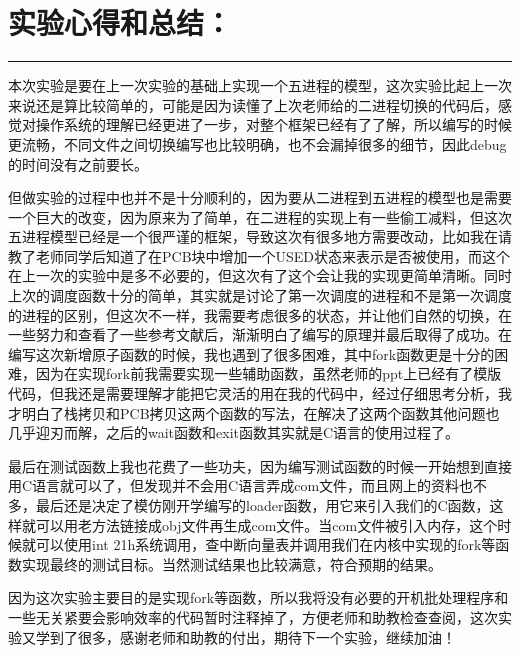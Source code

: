 \documentclass[UTF8]{article}
\begin{document}
\section{实验心得和总结：}
\noindent\rule[0.2\baselineskip]{\textwidth}{0.5pt}
\heiti
\par 本次实验是要在上一次实验的基础上实现一个五进程的模型，这次实验比起上一次来说还是算比较简单的，可能是因为读懂了上次老师给的二进程切换的代码后，感觉对操作系统的理解已经更进了一步，对整个框架已经有了了解，所以编写的时候更流畅，不同文件之间切换编写也比较明确，也不会漏掉很多的细节，因此debug的时间没有之前要长。
\par 但做实验的过程中也并不是十分顺利的，因为要从二进程到五进程的模型也是需要一个巨大的改变，因为原来为了简单，在二进程的实现上有一些偷工减料，但这次五进程模型已经是一个很严谨的框架，导致这次有很多地方需要改动，比如我在请教了老师同学后知道了在PCB块中增加一个USED状态来表示是否被使用，而这个在上一次的实验中是多不必要的，但这次有了这个会让我的实现更简单清晰。同时上次的调度函数十分的简单，其实就是讨论了第一次调度的进程和不是第一次调度的进程的区别，但这次不一样，我需要考虑很多的状态，并让他们自然的切换，在一些努力和查看了一些参考文献后，渐渐明白了编写的原理并最后取得了成功。在编写这次新增原子函数的时候，我也遇到了很多困难，其中fork函数更是十分的困难，因为在实现fork前我需要实现一些辅助函数，虽然老师的ppt上已经有了模版代码，但我还是需要理解才能把它灵活的用在我的代码中，经过仔细思考分析，我才明白了栈拷贝和PCB拷贝这两个函数的写法，在解决了这两个函数其他问题也几乎迎刃而解，之后的wait函数和exit函数其实就是C语言的使用过程了。
\par 最后在测试函数上我也花费了一些功夫，因为编写测试函数的时候一开始想到直接用C语言就可以了，但发现并不会用C语言弄成com文件，而且网上的资料也不多，最后还是决定了模仿刚开学编写的loader函数，用它来引入我们的C函数，这样就可以用老方法链接成obj文件再生成com文件。当com文件被引入内存，这个时候就可以使用int 21h系统调用，查中断向量表并调用我们在内核中实现的fork等函数实现最终的测试目标。当然测试结果也比较满意，符合预期的结果。
\par 因为这次实验主要目的是实现fork等函数，所以我将没有必要的开机批处理程序和一些无关紧要会影响效率的代码暂时注释掉了，方便老师和助教检查查阅，这次实验又学到了很多，感谢老师和助教的付出，期待下一个实验，继续加油！
\end{document}
